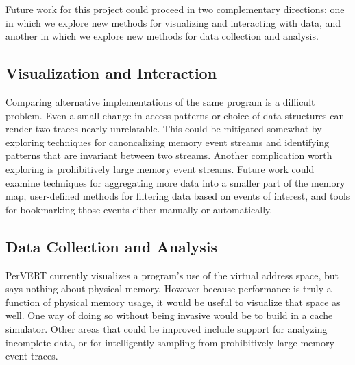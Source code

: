 \documentclass[annual]{acmsiggraph}
\begin{document}
  Future work for this project could proceed in two complementary directions:
    one in which we explore new methods for visualizing and interacting with data,
    and another in which we explore new methods for data collection and analysis.

  \subsection{Visualization and Interaction}

  Comparing alternative implementations of the same program is a difficult problem.
  Even a small change in access patterns or choice of data structures can render two traces nearly unrelatable.
  This could be mitigated somewhat by exploring techniques for canoncalizing memory event streams and identifying patterns
    that are invariant between two streams.
  Another complication worth exploring is prohibitively large memory event streams.  
  Future work could examine techniques for aggregating more data into a smaller part of the memory map,
    user-defined methods for filtering data based on events of interest,
    and tools for bookmarking those events either manually or automatically.

  \subsection{Data Collection and Analysis}

  PerVERT currently visualizes a program's use of the virtual address space, but says nothing about physical memory.
  However because performance is truly a function of physical memory usage, it would be useful to visualize that space as well.
  One way of doing so without being invasive would be to build in a cache simulator.
  Other areas that could be improved include support for analyzing incomplete data, 
    or for intelligently sampling from prohibitively large memory event traces.
\end{document}
